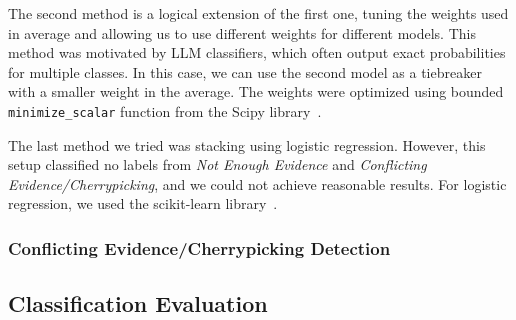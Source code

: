 The second method is a logical extension of the first one, tuning the weights used in average and allowing us to use different weights for different models. This method was motivated by LLM classifiers, which often output exact probabilities for multiple classes. In this case, we can use the second model as a tiebreaker with a smaller weight in the average. The weights were optimized using bounded \texttt{minimize\_scalar} function from the Scipy library~\cite{2020SciPy-NMeth}.

The last method we tried was stacking using logistic regression. However, this setup classified no labels from \textit{Not Enough Evidence} and \textit{Conflicting Evidence/Cherrypicking}, and we could not achieve reasonable results. For logistic regression, we used the scikit-learn library~\cite{scikit-learn}.

\subsubsection*{Conflicting Evidence/Cherrypicking Detection}


\subsection{Classification Evaluation}

